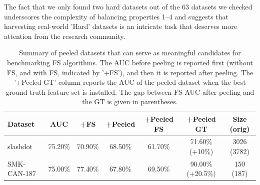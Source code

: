 \documentclass[preprint,12pt,authoryear]{elsarticle}
\begin{document}
The fact that we only found two hard datasets out of the 63 datasets we checked underscores the complexity of balancing properties 1–4 and suggests that harvesting real-world 'Hard' datasets is an intricate task that deserves more attention from the research community.



\begin{table}[h!]
\centering
\caption{Summary of peeled datasets that can serve as meaningful candidates for benchmarking FS algorithms. The AUC before peeling is reported first (without FS, and with FS, indicated by '+FS'), and then it is reported after peeling. The '+Peeled GT' column reports the AUC of the peeled dataset when the best ground truth feature set is installed. The gap between FS AUC after peeling and the GT is given in parentheses.}
\small
\label{tab:hard_peeled_dataset_summary}
\begin{tabular}{|l|c|c|c|c|c|c|}
\hline
\textbf{Dataset} & \textbf{AUC} & \textbf{+FS} & \textbf{+Peeled} & \textbf{+Peeled FS} & \textbf{+Peeled GT} & \textbf{Size {\color{red} (orig)} } \\ \hline
slashdot & 75.20\% & 70.90\% & 68.50\% & 61.70\% & 71.60\% (+10\%) & 3026 {\color{red} (3782)} \\ \hline
SMK-CAN-187 & 75.00\% & 77.40\% & 67.80\% & 69.50\% & 90.00\% (+20.5\%) & 150 {\color{red} (187)}  \\ \hline

\end{tabular}
\end{table}


\end{document}
